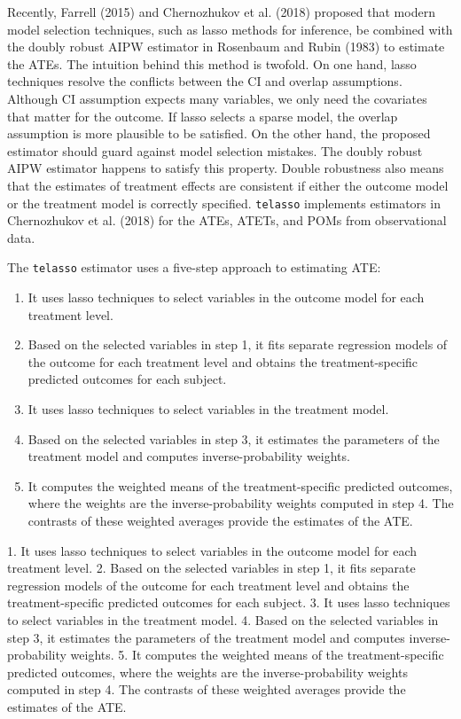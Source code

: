 Recently, Farrell (2015) and Chernozhukov et al. (2018) proposed that modern model selection techniques, such as lasso methods for inference, be combined with the doubly robust AIPW estimator in Rosenbaum and Rubin (1983) to estimate the ATEs. The intuition behind this method is twofold. On one hand, lasso techniques resolve the conflicts between the CI and overlap assumptions. Although CI assumption expects many variables, we only need the covariates that matter for the outcome. If lasso selects a sparse model, the overlap assumption is more plausible to be satisfied. On the other hand, the proposed estimator should guard against model selection mistakes. The doubly robust AIPW estimator happens to satisfy this property. Double robustness also means that the estimates of treatment effects are consistent if either the outcome model or the treatment model is correctly specified.
\texttt{telasso} implements estimators in Chernozhukov et al. (2018) for the ATEs, ATETs, and POMs from observational data.

\vspace{5pt}
The \texttt{telasso} estimator uses a five-step approach to estimating ATE:
\begin{enumerate}
\item It uses lasso techniques to select variables in the outcome model for each treatment level.
\item Based on the selected variables in step 1, it fits separate regression models of the outcome for each treatment level and obtains the treatment-specific predicted outcomes for each subject.
\item It uses lasso techniques to select variables in the treatment model.
\item Based on the selected variables in step 3, it estimates the parameters of the treatment model and computes inverse-probability weights.
\item It computes the weighted means of the treatment-specific predicted outcomes, where the weights are the inverse-probability weights computed in step 4. The contrasts of these weighted averages provide the estimates of the ATE.
\end{enumerate}

1. It uses lasso techniques to select variables in the outcome model for each treatment level.
2. Based on the selected variables in step 1, it fits separate regression models of the outcome for each treatment level and obtains the treatment-specific predicted outcomes for each subject.
3. It uses lasso techniques to select variables in the treatment model.
4. Based on the selected variables in step 3, it estimates the parameters of the treatment model and computes inverse-probability weights.
5. It computes the weighted means of the treatment-specific predicted outcomes, where the weights are the inverse-probability weights computed in step 4. The contrasts of these weighted averages provide the estimates of the ATE.

